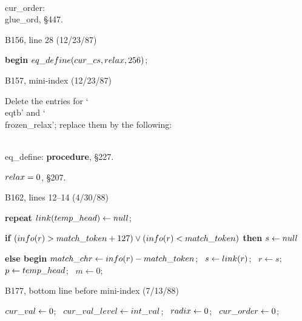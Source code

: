 \eightpoint\indent
\\{cur\_order}: \\{glue\_ord}, \S447.

\bugonpage B156, line 28 (12/23/87)

\ninepoint\noindent\hskip20pt
{\bf begin }$\\{eq\_define}(\\{cur\_cs},\\{relax},256)$;

\bugonpage B157, mini-index (12/23/87)

\eightpoint\noindent
Delete the entries for `\\{eqtb}' and `\\{frozen\_relax}'; replace them
by the following:

\indent\\{eq\_define}: {\bf procedure}, \S227.\par
$\\{relax}=0$, \S207.\par

\bugonpage B162, lines 12--14 (4/30/88)

\ninepoint\noindent\hskip10pt
{\bf repeat} $\\{link}(\\{temp\_head})\gets\\{null}$;\par\noindent\hskip20pt
{\bf if\/} $(\\{info}(r)>\\{match\_token}+127)\lor
 (\\{info}(r)<\\{match\_token})$ {\bf then}
 $s\gets\\{null}$\par\noindent\hskip20pt
{\bf else begin} $\\{match\_chr}\gets\\{info}(r)-\\{match\_token}$; \
 $s\gets\\{link}(r)$; \ $r\gets s$; \ $p\gets\\{temp\_head}$; \
 $m\gets 0$;

\bugonpage B177, bottom line before mini-index (7/13/88)

\ninepoint\noindent\hskip10pt
$\\{cur\_val}\gets0$; \ 
 $\\{cur\_val\_level}\gets\\{int\_val}$; \
 $\\{radix}\gets0$; \
 $\\{cur\_order}\gets0$;

